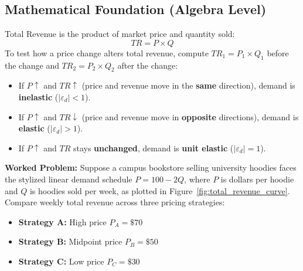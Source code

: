 \documentclass[11pt,letterpaper]{article}
\begin{document}
\subsection*{Mathematical Foundation (Algebra Level)}
Total Revenue is the product of market price and quantity sold:
\begin{equation}
TR = P \times Q
\end{equation}
To test how a price change alters total revenue, compute $TR_1 = P_1 \times Q_1$ before the change and $TR_2 = P_2 \times Q_2$ after the change:
\begin{itemize}
    \item If $P \uparrow$ and $TR \uparrow$ (price and revenue move in the \textbf{same} direction), demand is \textbf{inelastic} ($|\varepsilon_d| < 1$).
    \item If $P \uparrow$ and $TR \downarrow$ (price and revenue move in \textbf{opposite} directions), demand is \textbf{elastic} ($|\varepsilon_d| > 1$).
    \item If $P \uparrow$ and $TR$ stays \textbf{unchanged}, demand is \textbf{unit elastic} ($|\varepsilon_d| = 1$).
\end{itemize}

\noindent\textbf{Worked Problem:}
Suppose a campus bookstore selling university hoodies faces the stylized linear demand schedule $P = 100 - 2Q$, where $P$ is dollars per hoodie and $Q$ is hoodies sold per week, as plotted in Figure~\ref{fig:total_revenue_curve}. Compare weekly total revenue across three pricing strategies:
\begin{itemize}
    \item \textbf{Strategy A:} High price $P_A = \$70$
    \item \textbf{Strategy B:} Midpoint price $P_B = \$50$
    \item \textbf{Strategy C:} Low price $P_C = \$30$
\end{itemize}
\end{document}
